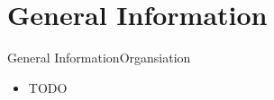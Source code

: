 
\section{General Information}

\begin{frame}{General Information}{Organsiation}
  \begin{itemize}
    \item TODO
  \end{itemize}
\end{frame}

